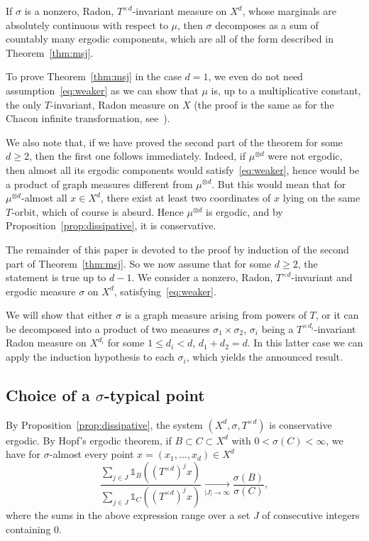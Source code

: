 \documentclass[10pt]{amsart}
\theoremstyle{definition}\newtheorem{defi}[theo]{Definition}\newtheorem{rema}[theo]{Remark}\newtheorem{exam}[theo]{Example}\newtheorem{exem}[theo]{Example}\newtheorem{nota}[theo]{Notation}
\newcommand{\tend}[3][]{\xrightarrow[#2\to#3]{#1}}
\newcommand{\ind}[1]{\mathds{1}_{#1}}
\newcommand{\td}{T^{\times d}}
\begin{document}
\begin{coro}\label{cor:main}
If $\sigma$ is a nonzero, Radon, $\td$-invariant measure on $X^d$, whose marginals are absolutely continuous with respect to $\mu$, then $\sigma$ decomposes as a sum of countably many ergodic components, which are all of the form described in Theorem~\ref{thm:msj}.
\end{coro}

To prove Theorem~\ref{thm:msj} in the case $d=1$, we even do not need assumption~\eqref{eq:weaker} as we can show that $\mu$ is, up to a multiplicative constant, the only $T$-invariant, Radon measure on $X$ (the proof is the same as for the Chacon infinite transformation, see~\cite[Proposition~2.4]{ChaconInfinite}).

We also note that, if we have proved the second part of the theorem for some $d\ge2$, then the first one follows immediately. Indeed, if $\mu^{\otimes d}$ were not ergodic, then almost all its ergodic components would satisfy~\eqref{eq:weaker}, hence would be a product of graph measures different from $\mu^{\otimes d}$. But this would mean that for $\mu^{\otimes d}$-almost all $x\in X^d$, there exist at least two coordinates of $x$ lying on the same $T$-orbit, which of course is absurd. Hence $\mu^{\otimes d}$ is ergodic, and by Proposition~\ref{prop:dissipative}, it is conservative.


The remainder of this paper is devoted to the proof by induction of the second part of Theorem~\ref{thm:msj}. So we now assume that for some $d\ge2$, the statement is true up to $d-1$. We consider a nonzero, Radon, $\td$-invariant and ergodic measure $\sigma$ on $X^d$, satisfying~\eqref{eq:weaker}.

We will show that either $\sigma$ is a graph measure arising from powers of $T$, or it can be decomposed into a product of two measures $\sigma_1\times\sigma_2$, $\sigma_i$ being a $T^{\times d_i}$-invariant Radon measure on $X^{d_i}$ for some $1\le d_i<d$, $d_1+d_2=d$. In this latter case we can apply the induction hypothesis to each $\sigma_i$, which yields the announced result.

\subsection{Choice of a \texorpdfstring{$\sigma$}{sigma}-typical point}\label{sec:typicalpoint}

By Proposition~\ref{prop:dissipative}, the system $(X^d,\sigma,\td)$ is conservative ergodic. By Hopf's ergodic theorem, if $B\subset C\subset X^d$ with $0<\sigma(C)<\infty$, we have for $\sigma$-almost every point $x=(x_1,\ldots,x_d)\in X^d$
\begin{equation}\label{eq:Hopf}
\dfrac{\sum_{j\in J}\ind{B}((\td)^jx)}{\sum_{j\in J}\ind{C}((\td)^jx)}
\tend{|J|}{\infty} \dfrac{\sigma(B)}{\sigma(C)},
\end{equation}
where the sums in the above expression range over a set $J$ of consecutive integers containing 0.
\end{document}
